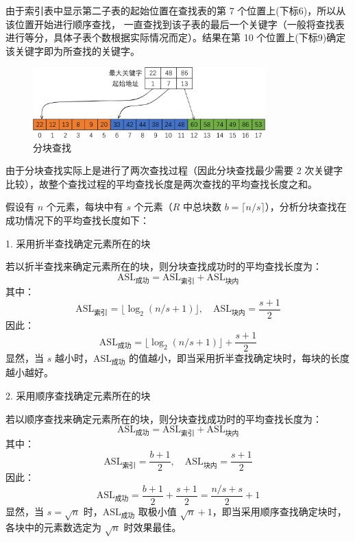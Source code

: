 \documentclass[lang=cn,newtx,10pt,scheme=chinese]{elegantbook}
\begin{document}
由于索引表中显示第二子表的起始位置在查找表的第 7 个位置上(下标6)，所以从该位置开始进行顺序查找，
一直查找到该子表的最后一个关键字（一般将查找表进行等分，具体子表个数根据实际情况而定）。结果在第 10 个位置上(下标9)确定该关键字即为所查找的关键字。

\begin{figure}
  
    \centering
    \includegraphics[width=0.8\textwidth]{./figure/pdf/cropped/indexTable.pdf}
    \caption{分块查找}
    \label{fig:blockSearch}

\end{figure}


由于分块查找实际上是进行了两次查找过程（因此分块查找最少需要 2 次关键字比较），故整个查找过程的平均查找长度是两次查找的平均查找长度之和。

假设有 $n$ 个元素，每块中有 $s$ 个元素（$R$ 中总块数 $b = \lceil n/s \rceil$），分析分块查找在成功情况下的平均查找长度如下：

1. 采用折半查找确定元素所在的块  

   若以折半查找来确定元素所在的块，则分块查找成功时的平均查找长度为：
   \[
   \text{ASL}_{\text{成功}} = \text{ASL}_{\text{索引}} + \text{ASL}_{\text{块内}}
   \]
   其中：
   \[
   \text{ASL}_{\text{索引}} = \lfloor \log_2 (n/s + 1) \rfloor, \quad \text{ASL}_{\text{块内}} = \frac{s+1}{2}
   \]
   因此：
   \[
   \text{ASL}_{\text{成功}} = \lfloor \log_2 (n/s + 1) \rfloor + \frac{s+1}{2}
   \]
   显然，当 $s$ 越小时，$\text{ASL}_{\text{成功}}$ 的值越小，即当采用折半查找确定块时，每块的长度越小越好。

2. 采用顺序查找确定元素所在的块  

   若以顺序查找来确定元素所在的块，则分块查找成功时的平均查找长度为：
   \[
   \text{ASL}_{\text{成功}} = \text{ASL}_{\text{索引}} + \text{ASL}_{\text{块内}}
   \]
   其中：
   \[
   \text{ASL}_{\text{索引}} = \frac{b+1}{2}, \quad \text{ASL}_{\text{块内}} = \frac{s+1}{2}
   \]
   因此：
   \[
   \text{ASL}_{\text{成功}} = \frac{b+1}{2} + \frac{s+1}{2} = \frac{n/s + s}{2} + 1
   \]
   显然，当 $s = \sqrt{n}$ 时，$\text{ASL}_{\text{成功}}$ 取极小值 $\sqrt{n} + 1$，即当采用顺序查找确定块时，各块中的元素数选定为 $\sqrt{n}$ 时效果最佳。
\end{document}
